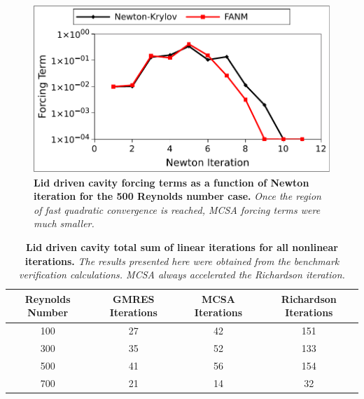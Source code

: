 \begin{figure}[t!]
  \begin{center}
    \includegraphics[width=6in]{chapters/nonlinear_problem/driven_re500_forcing.pdf}
  \end{center}
  \caption{\textbf{Lid driven cavity forcing terms as a function of
      Newton iteration for the 500 Reynolds number case.} \textit{Once
      the region of fast quadratic convergence is reached, MCSA
      forcing terms were much smaller.}}
  \label{fig:driven_re500_forcing}
\end{figure}

\begin{table}[h!]
  \begin{center}
    \begin{tabular}{cccc}\hline\hline
      \multicolumn{1}{c}{Reynolds Number}& 
      \multicolumn{1}{c}{GMRES Iterations}&
      \multicolumn{1}{c}{MCSA Iterations}&
      \multicolumn{1}{c}{Richardson Iterations}\\
      \hline
      100 & 27 & 42 & 151\\
      300 & 35 & 52 & 133\\
      500 & 41 & 56 & 154\\
      700 & 21 & 14 & 32\\
      \hline\hline
    \end{tabular}
  \end{center}
  \caption{\textbf{Lid driven cavity total sum of linear iterations
      for all nonlinear iterations.} \textit{The results presented
      here were obtained from the benchmark verification
      calculations. MCSA always accelerated the Richardson
      iteration.}}
  \label{tab:driven_linear_iter_comparison}
\end{table}

